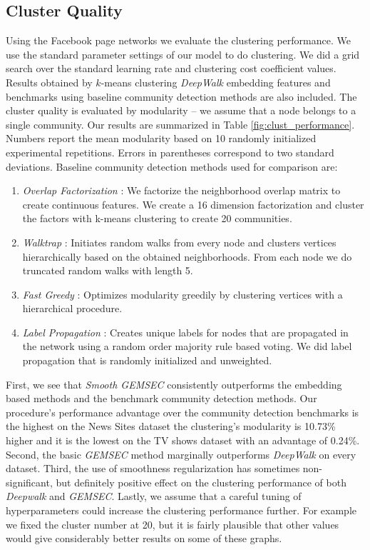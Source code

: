 \subsection{Cluster Quality}\label{subsec:com_qual}
Using the Facebook page networks we evaluate the clustering performance. We use the standard parameter settings of our model to do clustering.  We did a grid search over the standard learning rate and clustering cost coefficient values. Results obtained by $k$-means clustering \textit{DeepWalk} embedding features and benchmarks using baseline community detection methods are also included. The cluster quality is evaluated by modularity -- we assume that a node belongs to a single community. Our results are summarized in Table \ref{fig:clust_performance}. Numbers report the mean modularity based on 10 randomly initialized experimental repetitions. Errors in parentheses correspond to two standard deviations.
Baseline community detection methods used for comparison are:
\begin{enumerate}
	\item \textit{Overlap Factorization} \cite{ahmed2013distributed}: We factorize the neighborhood overlap matrix to create continuous features. We create a 16 dimension factorization and cluster the factors with k-means clustering to create 20 communities. 
\item \textit{Walktrap} \cite{walktrap}: Initiates random walks from every node and clusters vertices hierarchically based on the obtained neighborhoods. From each node we do truncated random walks with length 5.
\item \textit{Fast Greedy} \cite{fast_greedy}: Optimizes modularity greedily by clustering vertices with a hierarchical procedure.
\item \textit{Label Propagation} \cite{labelprop}: Creates unique labels for nodes that are propagated in the network using a random order majority rule based voting. We did label propagation that is randomly initialized and unweighted. 
\end{enumerate}
First, we see that \textit{Smooth GEMSEC} consistently outperforms the embedding based methods and the benchmark community detection methods. Our procedure's performance advantage over the community detection benchmarks is the highest on the News Sites dataset the clustering's modularity is 10.73\% higher and it is the lowest on the TV shows dataset with an advantage of 0.24\%. Second, the basic \textit{GEMSEC} method marginally outperforms \textit{DeepWalk} on every dataset.  Third, the use of smoothness regularization has sometimes non-significant, but definitely positive effect on the clustering performance of both \textit{Deepwalk} and \textit{GEMSEC}. Lastly, we assume that a careful tuning of hyperparameters could increase the clustering performance further. For example we fixed the cluster number at 20, but it is fairly plausible that other values would give considerably better results on some of these graphs.
